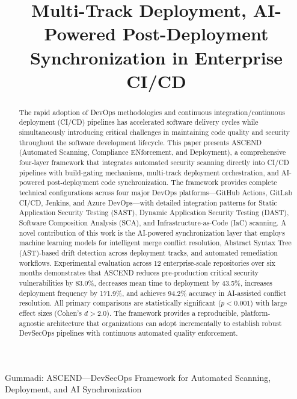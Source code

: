 \documentclass[journal]{IEEEtran}
\begin{document}
\title{Multi-Track Deployment, AI-Powered Post-Deployment Synchronization in Enterprise CI/CD}

\author{
}

%
{Gummadi: ASCEND---DevSecOps Framework for Automated Scanning, Deployment, and AI Synchronization}

\maketitle

\begin{abstract}
The rapid adoption of DevOps methodologies and continuous integration/continuous deployment (CI/CD) pipelines has accelerated software delivery cycles while simultaneously introducing critical challenges in maintaining code quality and security throughout the software development lifecycle. This paper presents ASCEND (Automated Scanning, Compliance ENforcement, and Deployment), a comprehensive four-layer framework that integrates automated security scanning directly into CI/CD pipelines with build-gating mechanisms, multi-track deployment orchestration, and AI-powered post-deployment code synchronization. The framework provides complete technical configurations across four major DevOps platforms---GitHub Actions, GitLab CI/CD, Jenkins, and Azure DevOps---with detailed integration patterns for Static Application Security Testing (SAST), Dynamic Application Security Testing (DAST), Software Composition Analysis (SCA), and Infrastructure-as-Code (IaC) scanning. A novel contribution of this work is the AI-powered synchronization layer that employs machine learning models for intelligent merge conflict resolution, Abstract Syntax Tree (AST)-based drift detection across deployment tracks, and automated remediation workflows. Experimental evaluation across 12 enterprise-scale repositories over six months demonstrates that ASCEND reduces pre-production critical security vulnerabilities by 83.0\%, decreases mean time to deployment by 43.5\%, increases deployment frequency by 171.9\%, and achieves 94.2\% accuracy in AI-assisted conflict resolution. All primary comparisons are statistically significant ($p < 0.001$) with large effect sizes (Cohen's $d > 2.0$). The framework provides a reproducible, platform-agnostic architecture that organizations can adopt incrementally to establish robust DevSecOps pipelines with continuous automated quality enforcement.
\end{abstract}
\end{document}

